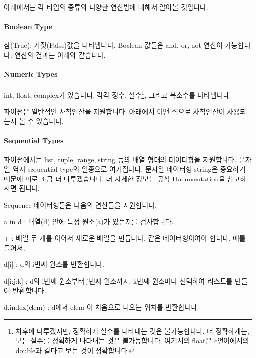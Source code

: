 \documentclass[twoside]{article}
\begin{document}
아래에서는 각 타입의 종류와 다양한 연산법에 대해서 알아볼 것입니다. 


\paragraph{Boolean Type} 참(True), 거짓(False)값을 나타냅니다. Boolean 값들은 and, or, not 연산이 가능합니다. 연산의 결과는 아래와 같습니다. 




\paragraph{Numeric Types} int, float, complex가 있습니다. 각각 정수, 실수\footnote{차후에 다루겠지만, 정확하게 실수를 나타내는 것은 불가능합니다. 더 정확하게는, 모든 실수를 정확하게 나타내는 것은 불가능합니다. 여기서의 float은 c언어에서의 double과 같다고 보는 것이 정확합니다.}, 그리고 복소수를 나타냅니다. 



파이썬은 일반적인 사칙연산을 지원합니다. 아래에서 어떤 식으로 사칙연산이 사용되는지 볼 수 있습니다. 




\paragraph{Sequential Types} 파이썬에서는 list, tuple, range, string 등의 배열 형태의 데이터형을 지원합니다. 문자열 역시 sequential type의 일종으로 여겨집니다. 문자열 데이터형 string은 중요하기 때문에 따로 조금 더 다루겠습니다. 더 자세한 정보는 \href{https://docs.python.org/3/library/stdtypes.html#sequence-types-list-tuple-range}{공식 Documentation}을 참고하시면 됩니다. 




Sequence 데이터형들은 다음의 연산들을 지원합니다. 
\begin{compactitem} 
\item a in d : 배열(d) 안에 특정 원소(a)가 있는지를 검사합니다. 
\item + : 배열 두 개를 이어서 새로운 배열을 만듭니다. 같은 데이터형이여야 합니다. 예를 들어서, 
\item d[i] : d의 i번째 원소를 반환합니다. 
\item d[i:j:k] : d의 i번째 원소부터 j번째 원소까지, k번째 원소마다 선택하여 리스트를 만들어 반환합니다. 
\item d.index(elem) : d에서 elem 이 처음으로 나오는 위치를 반환합니다. 
\end{compactitem}

\end{document}
